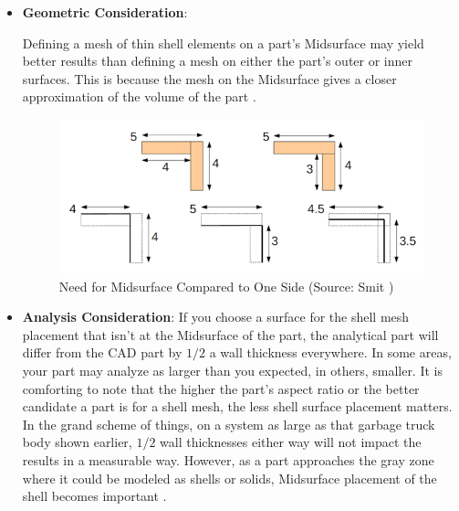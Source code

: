 \begin{itemize}[noitemsep,topsep=2pt,parsep=2pt,partopsep=2pt,leftmargin=*]
\begin{itemize}[noitemsep,topsep=2pt,parsep=2pt,partopsep=2pt,leftmargin=*]
\item \textbf{Geometric Consideration}:
	
Defining a mesh of thin shell elements on a part's Midsurface may yield better results than defining a mesh on either the part's outer or inner surfaces. This is because the mesh on the Midsurface  gives a closer approximation of the volume of the part \cite{SDRC2009}.
	


	\begin{figure} [!h]
		\centering
		\includegraphics[width=0.8\linewidth]{images/OneSide}
		\caption{Need for Midsurface Compared to One Side (Source: Smit \cite{Smit2011})}
		\label{fig:litsurvey:oneside}
	\end{figure}
	


\item \textbf{Analysis Consideration}:
If you choose a surface for the shell mesh placement that isn't at the Midsurface of the part, the analytical part will differ from the CAD part by $1/2$  a wall thickness everywhere.  In some areas, your part may analyze as larger than you expected, in others, smaller.  It is comforting to note that the higher the part's aspect ratio or the better candidate a part is for a shell mesh, the less shell surface placement matters. In the grand scheme of things, on a system as large as that garbage truck body shown earlier, $1/2$   wall thicknesses either way will not impact the results in a measurable way. However, as a part approaches the gray zone where it could be modeled as shells or solids, Midsurface placement of the shell becomes important \cite{Cosmos2006}.
\end{itemize}


\end{itemize}
